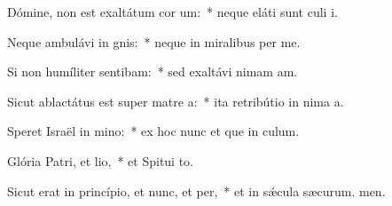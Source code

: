 \item Dómine, non est exaltátum cor um:~* neque eláti sunt culi i.
\item Neque ambulávi in gnis:~* neque in miralibus per me.
\item Si non humíliter sentibam:~* sed exaltávi nimam am.
\item Sicut ablactátus est super matre a:~* ita retribútio in nima a.
\item Speret Israël in mino:~* ex hoc nunc et que in culum.
\item Glória Patri, et lio,~* et Spitui to.
\item Sicut erat in princípio, et nunc, et per,~* et in sǽcula sæcurum. men.
